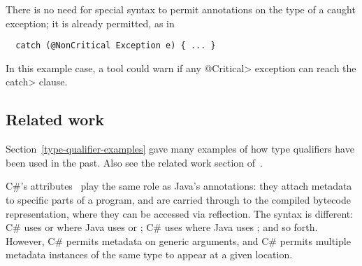 \documentclass[10pt]{article}
\newcommand{\preverbnegspace}{\vspace{-5pt}}
\begin{document}

There is no need for special syntax to permit annotations on the type of a
caught exception; it is already permitted, as in

\preverbnegspace
\begin{Verbatim}
  catch (@NonCritical Exception e) { ... }
\end{Verbatim}

\noindent
In this example case, a tool could warn if any \<@Critical> exception can
reach the \<catch> clause.

% 
% 
% 
% 


\subsection{Related work\label{related-work}}

Section~\ref{type-qualifier-examples} gave many examples of how type
qualifiers have been used in the past.  Also see the related work section
of~\cite{PapiACPE2008}.

C\#'s attributes~\cite[chap.~24]{ECMA334-4th} play the same role as Java's
annotations:  they attach metadata to specific parts of a program, and are
carried through to the compiled bytecode representation, where they can be
accessed via reflection.  The syntax is different:  C\# uses
\code{[AnnotationName]} or  where Java uses
 or
; C\# uses  where
Java uses ; and so forth.
However, C\# permits metadata
on generic arguments, and C\# permits multiple metadata instances of the
same type to appear at a given location.
\end{document}
